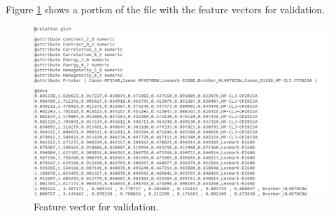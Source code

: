 \documentclass[10pt,twocolumn,letterpaper]{article}
\begin{document}
Figure \ref{fig:validation} shows a portion of the file with the feature vectors for validation.

\begin{figure}
\begin{center}
	\includegraphics[width=2\columnwidth]{validation}
	\caption{Feature vector for validation.}
\label{fig:validation}   
\end{center} 
\end{figure}
\end{document}

